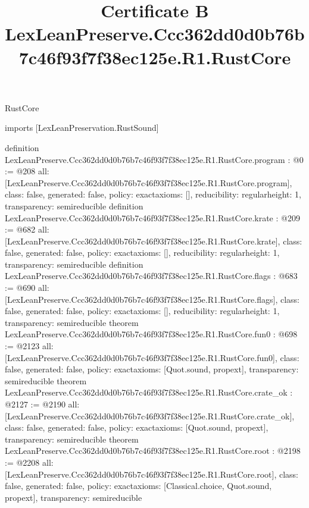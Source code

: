 \begin{lexlean}{RustCore}
\title{Certificate B LexLeanPreserve.Ccc362dd0d0b76b7c46f93f7f38ec125e.R1.RustCore}
\begin{coremodule}
imports [LexLeanPreservation.RustSound]

definition LexLeanPreserve.Ccc362dd0d0b76b7c46f93f7f38ec125e.R1.RustCore.program : @0 := @208 {
  all: [LexLeanPreserve.Ccc362dd0d0b76b7c46f93f7f38ec125e.R1.RustCore.program],
  class: false,
  generated: false,
  policy: exact{axioms: []},
  reducibility: regular{height: 1},
  transparency: semireducible
}
definition LexLeanPreserve.Ccc362dd0d0b76b7c46f93f7f38ec125e.R1.RustCore.krate : @209 := @682 {
  all: [LexLeanPreserve.Ccc362dd0d0b76b7c46f93f7f38ec125e.R1.RustCore.krate],
  class: false,
  generated: false,
  policy: exact{axioms: []},
  reducibility: regular{height: 1},
  transparency: semireducible
}
definition LexLeanPreserve.Ccc362dd0d0b76b7c46f93f7f38ec125e.R1.RustCore.flags : @683 := @690 {
  all: [LexLeanPreserve.Ccc362dd0d0b76b7c46f93f7f38ec125e.R1.RustCore.flags],
  class: false,
  generated: false,
  policy: exact{axioms: []},
  reducibility: regular{height: 1},
  transparency: semireducible
}
theorem LexLeanPreserve.Ccc362dd0d0b76b7c46f93f7f38ec125e.R1.RustCore.fun0 : @698 := @2123 {
  all: [LexLeanPreserve.Ccc362dd0d0b76b7c46f93f7f38ec125e.R1.RustCore.fun0],
  class: false,
  generated: false,
  policy: exact{axioms: [Quot.sound, propext]},
  transparency: semireducible
}
theorem LexLeanPreserve.Ccc362dd0d0b76b7c46f93f7f38ec125e.R1.RustCore.crate_ok : @2127 := @2190 {
  all: [LexLeanPreserve.Ccc362dd0d0b76b7c46f93f7f38ec125e.R1.RustCore.crate_ok],
  class: false,
  generated: false,
  policy: exact{axioms: [Quot.sound, propext]},
  transparency: semireducible
}
theorem LexLeanPreserve.Ccc362dd0d0b76b7c46f93f7f38ec125e.R1.RustCore.root : @2198 := @2208 {
  all: [LexLeanPreserve.Ccc362dd0d0b76b7c46f93f7f38ec125e.R1.RustCore.root],
  class: false,
  generated: false,
  policy: exact{axioms: [Classical.choice, Quot.sound, propext]},
  transparency: semireducible
}


\end{coremodule}
\end{lexlean}
